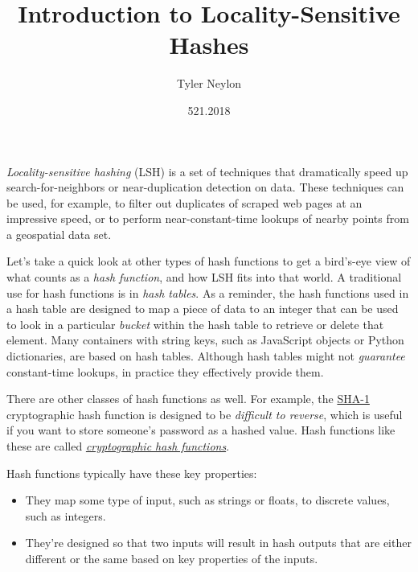 \documentclass[20pt,]{extarticle}
\title{Introduction to Locality-Sensitive Hashes}
\author{Tyler Neylon}
\date{521.2018}
\providecommand{\tightlist}{%
  \setlength{\itemsep}{0pt}\setlength{\parskip}{0pt}}
\newcommand{\class}[1]{}
\newcommand{\optquad}{\quad}
\newcommand{\smallscrneg}{}
\newcommand{\smallscr}[1]{}
\newcommand{\bigscr}[1]{#1}
\newcommand{\smallscrskip}[1]{}
\begin{document}
\maketitle

\newcommand{\R}{\mathbb{R}}
\newcommand{\Z}{\mathbb{Z}}
\newcommand{\eqnset}[1]{\left.\mbox{$#1$}\;\;\right\rbrace\class{postbrace}{ }}
\providecommand{\optquad}{\class{optquad}{}}
\providecommand{\smallscrneg}{\class{smallscrneg}{ }}
\providecommand{\bigscr}[1]{\class{bigscr}{#1}}
\providecommand{\smallscr}[1]{\class{smallscr}{#1}}
\providecommand{\smallscrskip}[1]{\class{smallscrskip}{\hskip #1}}

\emph{Locality-sensitive hashing} (LSH) is a set of techniques that
dramatically speed up search-for-neighbors or near-duplication detection
on data. These techniques can be used, for example, to filter out
duplicates of scraped web pages at an impressive speed, or to perform
near-constant-time lookups of nearby points from a geospatial data set.

Let's take a quick look at other types of hash functions to get a
bird's-eye view of what counts as a \emph{hash function}, and how LSH
fits into that world. A traditional use for hash functions is in
\emph{hash tables}. As a reminder, the hash functions used in a hash
table are designed to map a piece of data to an integer that can be used
to look in a particular \emph{bucket} within the hash table to retrieve
or delete that element. Many containers with string keys, such as
JavaScript objects or Python dictionaries, are based on hash tables.
Although hash tables might not \emph{guarantee} constant-time lookups,
in practice they effectively provide them.

There are other classes of hash functions as well. For example, the
\href{https://en.wikipedia.org/wiki/SHA-1}{SHA-1} cryptographic hash
function is designed to be \emph{difficult to reverse}, which is useful
if you want to store someone's password as a hashed value. Hash
functions like these are called
\href{https://en.wikipedia.org/wiki/Cryptographic_hash_function}{\emph{cryptographic
hash functions}}.

Hash functions typically have these key properties:

\begin{itemize}
\tightlist
\item
  They map some type of input, such as strings or floats, to discrete
  values, such as integers.
\item
  They're designed so that two inputs will result in hash outputs that
  are either different or the same based on key properties of the
  inputs.
\end{itemize}
\end{document}
